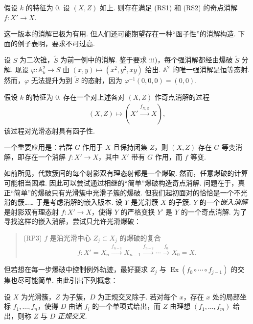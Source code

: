 \begin{theorem}[Hironaka]\label{item:ag-4-1-6}
假设 $k$ 的特征为 $0$. 设 $(X,Z)$ 如上. 则存在满足 (RS1) 和 (RS2) 的奇点消解 $f:X'\longrightarrow X$.
\end{theorem}
这一版本的消解已极为有用. 但人们还可能期望存在一种``函子性''的消解构造. 下面的例子表明，要求不可过高.
\begin{example}\label{item:ag-4-1-7}
设 $S$ 为二次锥，$\widetilde S$ 为前一例中的消解. 鉴于要求 iii)，每个强消解都经由爆破 $\widetilde S$ 分解. 现设 $\varphi:\mathbb A_k^2\longrightarrow S$ 由 $(x,y)\mapsto(x^2,y^2,xy)$ 给出. $\mathbb A^2$ 的唯一强消解是恒等态射. 然而，$\varphi$ 无法提升为到 $\widetilde S$ 的态射，因为 $\varphi^{-1}(0,0,0)=(0,0)$.
\end{example}
\begin{theorem}[Hironaka ?]\label{item:ag-4-1-8}
假设 $k$ 的特征为 $0$. 存在一个对上述各对 $(X,Z)$ 作奇点消解的过程
\begin{align*}
(X,Z)\longmapsto (X'\xrightarrow{f_{X,Z}}X),
\end{align*}
该过程对光滑态射具有函子性.
\end{theorem}
一个重要应用是：若群 $G$ 作用于 $X$ 且保持闭集 $Z$，则 $(X,Z)$ 存在 $G$-等变消解，即存在一个消解 $f:X'\longrightarrow X$，其中 $X'$ 带有 $G$ 作用，而 $f$ 等变.
\begin{numpara}\label{item:ag-4-1-9}
如前所见，代数簇间的每个射影双有理态射都是一个爆破. 然而，任意爆破的计算可能相当困难. 因此可以尝试通过相继的``简单''爆破构造奇点消解. 问题在于，真正``简单''的爆破只有光滑簇中光滑子簇的爆破. 但我们起初面对的恰恰是一个不光滑的簇……
于是考虑消解的嵌入版本. 设 $Y$ 是光滑簇 $X$ 的子簇. $Y$ 的一个\emph{嵌入消解}是射影双有理态射 $f:X'\longrightarrow X$，使得 $Y$ 的严格变换 $Y'$ 是 $Y$ 的一个奇点消解.
为了寻找这样的嵌入消解，尝试只允许光滑爆破：
\begin{quote}
\textup{(RP3)} $f$ 是沿光滑中心 $Z_j\subset X_j$ 的爆破的复合
\begin{align*}
f:X'=X_n\xrightarrow{f_{n-1}}X_{n-1}\xrightarrow{f_{n-2}}\cdots\xrightarrow{f_0}X_0=X.
\end{align*}
\end{quote}
但若想在每一步爆破中控制例外轨迹，最好要求 $Z_j$ 与 $\operatorname{Ex}(f_0\circ\cdots\circ f_{j-1})$ 的交集也尽可能简单. 由此引出下列概念：
\end{numpara}
\begin{definition}\label{item:ag-4-1-10}
设 $X$ 为光滑簇，$Z$ 为子簇，$D$ 为正规交叉除子. 若对每个 $x$，存在 $x$ 处的局部坐标 $f_1,\ldots,f_n$，使得 $D$ 由诸 $f_i$ 的一个单项式给出，而 $Z$ 由理想 $(f_1,\ldots,f_m)$ 给出，则称 $Z$ 与 $D$ \emph{正规交叉}.
\end{definition}
